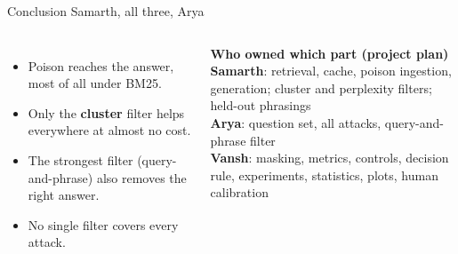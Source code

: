 \documentclass[aspectratio=169,11pt]{beamer}
\newcommand{\who}[1]{\hfill{\normalsize\color{muted}\textmd{#1}}}
\begin{document}
\begin{frame}[t]{Conclusion \who{Samarth, all three, Arya}}
\begin{columns}[T]
\begin{itemize}
\item Poison reaches the answer, most of all under BM25.
\item Only the \textbf{cluster} filter helps everywhere at almost no cost.
\item The strongest filter (query-and-phrase) also removes the right answer.
\item No single filter covers every attack.
\end{itemize}
\textbf{Who owned which part (project plan)}\\[2pt]
\footnotesize
\textbf{Samarth}: retrieval, cache, poison ingestion, generation; cluster and perplexity filters; held-out phrasings\\[3pt]
\textbf{Arya}: question set, all attacks, query-and-phrase filter\\[3pt]
\textbf{Vansh}: masking, metrics, controls, decision rule, experiments, statistics, plots, human calibration
\end{columns}
\end{frame}
\end{document}
